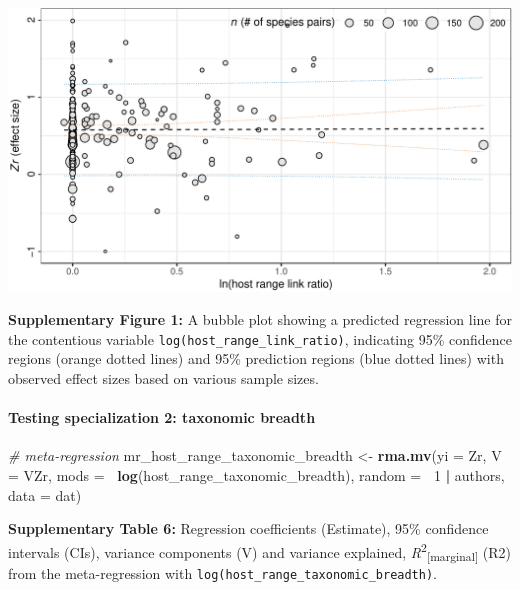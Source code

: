 \documentclass[
]{article}
\newenvironment{Shaded}{\begin{snugshade}}{\end{snugshade}}
\newcommand{\CommentTok}[1]{\textcolor[rgb]{0.56,0.35,0.01}{\textit{#1}}}
\newcommand{\DataTypeTok}[1]{\textcolor[rgb]{0.13,0.29,0.53}{#1}}
\newcommand{\DecValTok}[1]{\textcolor[rgb]{0.00,0.00,0.81}{#1}}
\newcommand{\KeywordTok}[1]{\textcolor[rgb]{0.13,0.29,0.53}{\textbf{#1}}}
\newcommand{\NormalTok}[1]{#1}
\newcommand{\OperatorTok}[1]{\textcolor[rgb]{0.81,0.36,0.00}{\textbf{#1}}}
\newcommand{\StringTok}[1]{\textcolor[rgb]{0.31,0.60,0.02}{#1}}
\begin{document}
\includegraphics{Supporting_Information_files/figure-latex/unnamed-chunk-25-1.pdf}

\textbf{Supplementary Figure 1:} A bubble plot showing a predicted
regression line for the contentious variable
\texttt{log(host\_range\_link\_ratio)}, indicating 95\% confidence
regions (orange dotted lines) and 95\% prediction regions (blue dotted
lines) with observed effect sizes based on various sample sizes.

\hypertarget{testing-specialization-2-taxonomic-breadth}{%
\paragraph{Testing specialization 2: taxonomic
breadth}\label{testing-specialization-2-taxonomic-breadth}}

\begin{Shaded}
\begin{Highlighting}[]
\CommentTok{# meta-regression}
\NormalTok{mr_host_range_taxonomic_breadth <-}\StringTok{ }\KeywordTok{rma.mv}\NormalTok{(}\DataTypeTok{yi =}\NormalTok{ Zr, }\DataTypeTok{V =}\NormalTok{ VZr, }\DataTypeTok{mods =} \OperatorTok{~}\KeywordTok{log}\NormalTok{(host_range_taxonomic_breadth), }
    \DataTypeTok{random =} \OperatorTok{~}\DecValTok{1} \OperatorTok{|}\StringTok{ }\NormalTok{authors, }\DataTypeTok{data =}\NormalTok{ dat)}
\end{Highlighting}
\end{Shaded}

\textbf{Supplementary Table 6:} Regression coefficients (Estimate), 95\%
confidence intervals (CIs), variance components (V) and variance
explained, \emph{R}\textsuperscript{2}\textsubscript{{[}marginal{]}}
(R2) from the meta-regression with
\texttt{log(host\_range\_taxonomic\_breadth)}.
\end{document}
